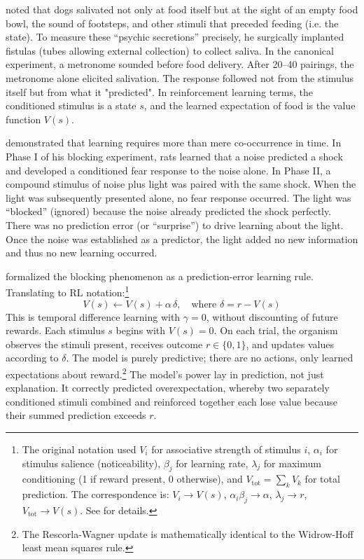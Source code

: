 \citet{Pavlov1927} noted that dogs salivated not only at food itself but at the sight of an empty food bowl, the sound of footsteps, and other stimuli that preceded feeding (i.e. the state). To measure these ``psychic secretions'' precisely, he surgically implanted fistulas (tubes allowing external collection) to collect saliva. In the canonical experiment, a metronome sounded before food delivery. After 20--40 pairings, the metronome alone elicited salivation. The response followed not from the stimulus itself but from what it "predicted". In reinforcement learning terms, the conditioned stimulus is a state $s$, and the learned expectation of food is the value function $V(s)$.

\citet{Kamin1969} demonstrated that learning requires more than mere co-occurrence in time. In Phase I of his blocking experiment, rats learned that a noise predicted a shock and developed a conditioned fear response to the noise alone. In Phase II, a compound stimulus of noise plus light was paired with the same shock. When the light was subsequently presented alone, no fear response occurred. The light was ``blocked'' (ignored) because the noise already predicted the shock perfectly. There was no prediction error (or ``surprise'') to drive learning about the light. Once the noise was established as a predictor, the light added no new information and thus no new learning occurred.

\citet{RescorlaWagner1972} formalized the blocking phenomenon as a prediction-error learning rule. Translating to RL notation:\footnote{The original notation used $V_i$ for associative strength of stimulus $i$, $\alpha_i$ for stimulus salience (noticeability), $\beta_j$ for learning rate, $\lambda_j$ for maximum conditioning (1 if reward present, 0 otherwise), and $V_{\text{tot}} = \sum_k V_k$ for total prediction. The correspondence is: $V_i \to V(s)$, $\alpha_i \beta_j \to \alpha$, $\lambda_j \to r$, $V_{\text{tot}} \to V(s)$. See \citet{SuttonBarto1990} for details.}
\begin{equation}
V(s) \leftarrow V(s) + \alpha \, \delta, \quad \text{where } \delta = r - V(s)
\end{equation}
This is temporal difference learning with $\gamma = 0$, without discounting of future rewards. Each stimulus $s$ begins with $V(s) = 0$. On each trial, the organism observes the stimuli present, receives outcome $r \in \{0, 1\}$, and updates values according to $\delta$. The model is purely predictive; there are no actions, only learned expectations about reward.\footnote{The Rescorla-Wagner update is mathematically identical to the Widrow-Hoff least mean squares rule.} The model's power lay in prediction, not just explanation. It correctly predicted overexpectation, whereby two separately conditioned stimuli combined and reinforced together each lose value because their summed prediction exceeds $r$.

